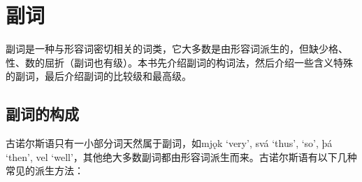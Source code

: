 \section{副词}\label{副词}

副词是一种与形容词密切相关的词类，它大多数是由形容词派生的，但缺少格、性、数的屈折（副词也有级）。本书先介绍副词的构词法，然后介绍一些含义特殊的副词，最后介绍副词的比较级和最高级。

\subsection{副词的构成}\label{副词的构成}

古诺尔斯语只有一小部分词天然属于副词，如mjǫk `very', svá `thus', `so', þá `then', vel `well'，其他绝大多数副词都由形容词派生而来。古诺尔斯语有以下几种常见的派生方法：

